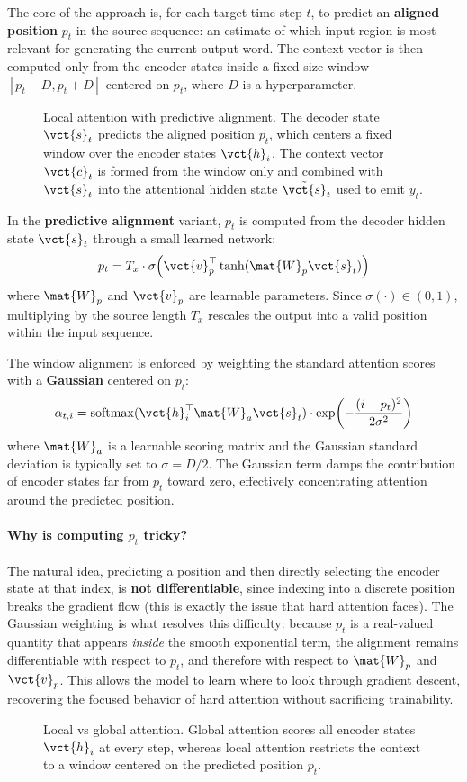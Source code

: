 The core of the approach is, for each target time step $t$, to predict an \textbf{aligned position} $p_t$ in the source sequence: an estimate of which input region is most relevant for generating the current output word.
The context vector is then computed only from the encoder states inside a fixed-size window $[p_t - D, p_t + D]$ centered on $p_t$, where $D$ is a hyperparameter.

\begin{figure}[H]
    \centering
    
    \caption{Local attention with predictive alignment. The decoder state $\vct{s}_t$ predicts the aligned position $p_t$, which centers a fixed window over the encoder states $\vct{h}_i$. The context vector $\vct{c}_t$ is formed from the window only and combined with $\vct{s}_t$ into the attentional hidden state $\tilde{\vct{s}}_t$ used to emit $y_t$.}
\end{figure}

In the \textbf{predictive alignment} variant, $p_t$ is computed from the decoder hidden state $\vct{s}_t$ through a small learned network:
\[
p_t = T_x \cdot \sigma\!\left(\vct{v}_p^\top \tanh(\mat{W}_p \vct{s}_t)\right)
\]
where $\mat{W}_p$ and $\vct{v}_p$ are learnable parameters.
Since $\sigma(\cdot) \in (0, 1)$, multiplying by the source length $T_x$ rescales the output into a valid position within the input sequence.

The window alignment is enforced by weighting the standard attention scores with a \textbf{Gaussian} centered on $p_t$:
\[
\alpha_{t,i} = \mathrm{softmax}(\vct{h}_i^\top \mat{W}_a \vct{s}_t) \cdot \exp\!\left(-\frac{(i - p_t)^2}{2\sigma^2}\right)
\]
where $\mat{W}_a$ is a learnable scoring matrix and the Gaussian standard deviation is typically set to $\sigma = D/2$.
The Gaussian term damps the contribution of encoder states far from $p_t$ toward zero, effectively concentrating attention around the predicted position.

\paragraph{Why is computing $p_t$ tricky?}
The natural idea, predicting a position and then directly selecting the encoder state at that index, is \textbf{not differentiable}, since indexing into a discrete position breaks the gradient flow (this is exactly the issue that hard attention faces).
The Gaussian weighting is what resolves this difficulty: because $p_t$ is a real-valued quantity that appears \textit{inside} the smooth exponential term, the alignment remains differentiable with respect to $p_t$, and therefore with respect to $\mat{W}_p$ and $\vct{v}_p$.
This allows the model to learn where to look through gradient descent, recovering the focused behavior of hard attention without sacrificing trainability.

\begin{figure}[H]
    \centering
    
    \caption{Local vs global attention. Global attention scores all encoder states $\vct{h}_i$ at every step, whereas local attention restricts the context to a window centered on the predicted position $p_t$.}
\end{figure}
